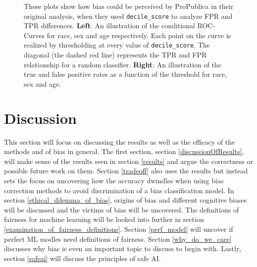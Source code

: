 \documentclass[11pt, fleqn, titlepage]{article}
\begin{document}
\begin{figure}[H]
\begin{subfigure}{0.5\textwidth}
		\end{subfigure}
		\caption{These plots show how bias could be perceived by ProPublica in their original analysis, when they used \texttt{decile\_score} to analyze FPR and TPR differences. \textbf{Left}: An illustration of the conditional ROC-Curves for race, sex and age respectively. Each point on the curve is realized by thresholding at every value of \texttt{decile\_score}. The diagonal (the dashed red line) represents the TPR and FPR relationship for a random classifier. \textbf{Right}: An illustration of the true and false positive rates as a function of the threshold for race, sex and age.}
	\end{figure}
	
	\section{Discussion} \label{discussion}	
	This section will focus on discussing the results as well as the efficacy of the methods and of bias in general. The first section, section \ref{discussionOfResults}, will make sense of the results seen in section \ref{results} and argue the correctness or possible future work on them. Section \ref{tradeoff} also uses the results but instead sets the focus on uncovering how the accuracy dwindles when using bias correction methods to avoid discrimination of a bias classification model. In section \ref{ethical_dilemma_of_bias}, origins of bias and different cognitive biases will be discussed and the victims of bias will be uncovered. The definitions of fairness for machine learning will be looked into further in section \ref{examination_of_fairness_definitions}. Section \ref{perf_model} will uncover if perfect ML modles need definitions of fairness. Section \ref{why_do_we_care} discusses why bias is even an important topic to discuss to begin with. Lastly, section \ref{safeai} will discuss the principles of safe AI.
	
\end{document}
